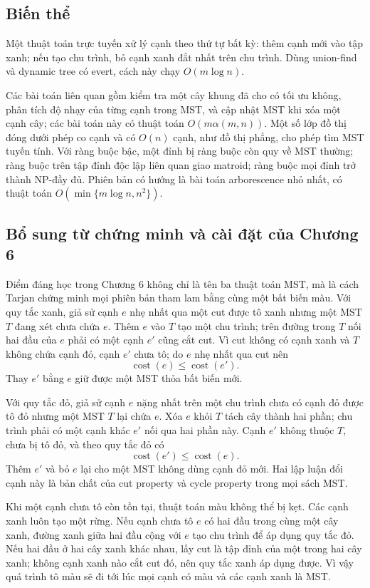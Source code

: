 \documentclass[11pt]{article}
\begin{document}
\subsection*{Biến thể}

Một thuật toán trực tuyến xử lý cạnh theo thứ tự bất kỳ: thêm cạnh mới vào tập
xanh; nếu tạo chu trình, bỏ cạnh xanh đắt nhất trên chu trình. Dùng union-find
và dynamic tree có evert, cách này chạy \(O(m\log n)\).

Các bài toán liên quan gồm kiểm tra một cây khung đã cho có tối ưu không, phân
tích độ nhạy của từng cạnh trong MST, và cập nhật MST khi xóa một cạnh cây; các
bài toán này có thuật toán \(O(m\alpha(m,n))\). Một số lớp đồ thị đóng dưới phép
co cạnh và có \(O(n)\) cạnh, như đồ thị phẳng, cho phép tìm MST tuyến tính. Với
ràng buộc bậc, một đỉnh bị ràng buộc còn quy về MST thường; ràng buộc trên tập
đỉnh độc lập liên quan giao matroid; ràng buộc mọi đỉnh trở thành NP-đầy đủ.
Phiên bản có hướng là bài toán arborescence nhỏ nhất, có thuật toán
\(O(\min\{m\log n,n^2\})\).

\subsection*{Bổ sung từ chứng minh và cài đặt của Chương 6}

Điểm đáng học trong Chương 6 không chỉ là tên ba thuật toán MST, mà là cách
Tarjan chứng minh mọi phiên bản tham lam bằng cùng một bất biến màu. Với quy
tắc xanh, giả sử cạnh \(e\) nhẹ nhất qua một cut được tô xanh nhưng một MST
\(T\) đang xét chưa chứa \(e\). Thêm \(e\) vào \(T\) tạo một chu trình; trên
đường trong \(T\) nối hai đầu của \(e\) phải có một cạnh \(e'\) cũng cắt cut.
Vì cut không có cạnh xanh và \(T\) không chứa cạnh đỏ, cạnh \(e'\) chưa tô; do
\(e\) nhẹ nhất qua cut nên
\[
  \operatorname{cost}(e)\le \operatorname{cost}(e').
\]
Thay \(e'\) bằng \(e\) giữ được một MST thỏa bất biến mới.

Với quy tắc đỏ, giả sử cạnh \(e\) nặng nhất trên một chu trình chưa có cạnh đỏ
được tô đỏ nhưng một MST \(T\) lại chứa \(e\). Xóa \(e\) khỏi \(T\) tách cây
thành hai phần; chu trình phải có một cạnh khác \(e'\) nối qua hai phần này.
Cạnh \(e'\) không thuộc \(T\), chưa bị tô đỏ, và theo quy tắc đỏ có
\[
  \operatorname{cost}(e')\le \operatorname{cost}(e).
\]
Thêm \(e'\) và bỏ \(e\) lại cho một MST không dùng cạnh đỏ mới. Hai lập luận
đổi cạnh này là bản chất của cut property và cycle property trong mọi sách MST.

Khi một cạnh chưa tô còn tồn tại, thuật toán màu không thể bị kẹt. Các cạnh
xanh luôn tạo một rừng. Nếu cạnh chưa tô \(e\) có hai đầu trong cùng một cây
xanh, đường xanh giữa hai đầu cộng với \(e\) tạo chu trình để áp dụng quy tắc
đỏ. Nếu hai đầu ở hai cây xanh khác nhau, lấy cut là tập đỉnh của một trong hai
cây xanh; không cạnh xanh nào cắt cut đó, nên quy tắc xanh áp dụng được. Vì
vậy quá trình tô màu sẽ đi tới lúc mọi cạnh có màu và các cạnh xanh là MST.
\end{document}
